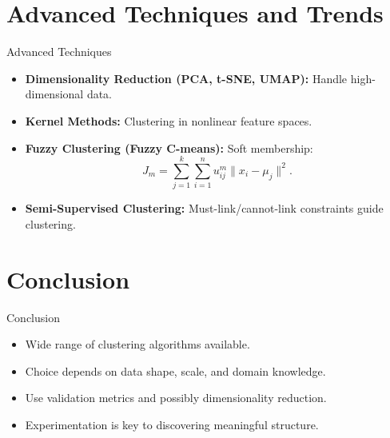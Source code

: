 \documentclass{beamer}
\begin{document}
\section{Advanced Techniques and Trends}
\begin{frame}{Advanced Techniques}
    \begin{itemize}
        \item \textbf{Dimensionality Reduction (PCA, t-SNE, UMAP):} Handle high-dimensional data.
        \item \textbf{Kernel Methods:} Clustering in nonlinear feature spaces.
        \item \textbf{Fuzzy Clustering (Fuzzy C-means):} Soft membership:
              \[
                  J_m = \sum_{j=1}^k \sum_{i=1}^n u_{ij}^m \|x_i - \mu_j\|^2.
              \]
        \item \textbf{Semi-Supervised Clustering:} Must-link/cannot-link constraints guide clustering.
    \end{itemize}
\end{frame}

\section{Conclusion}
\begin{frame}{Conclusion}
    \begin{itemize}
        \item Wide range of clustering algorithms available.
        \item Choice depends on data shape, scale, and domain knowledge.
        \item Use validation metrics and possibly dimensionality reduction.
        \item Experimentation is key to discovering meaningful structure.
    \end{itemize}
\end{frame}
\end{document}
